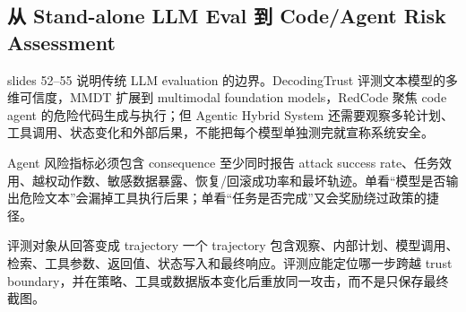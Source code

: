 \subsection{从 Stand-alone LLM Eval 到 Code/Agent Risk Assessment}

slides 52--55 说明传统 LLM evaluation 的边界。DecodingTrust 评测文本模型的多维可信度，MMDT 扩展到 multimodal foundation models，RedCode 聚焦 code agent 的危险代码生成与执行；但 Agentic Hybrid System 还需要观察多轮计划、工具调用、状态变化和外部后果，不能把每个模型单独测完就宣称系统安全。


\begin{importantbox}{Agent 风险指标必须包含 consequence}
至少同时报告 attack success rate、任务效用、越权动作数、敏感数据暴露、恢复/回滚成功率和最坏轨迹。单看“模型是否输出危险文本”会漏掉工具执行后果；单看“任务是否完成”又会奖励绕过政策的捷径。
\end{importantbox}

\begin{knowledgebox}{评测对象从回答变成 trajectory}
一个 trajectory 包含观察、内部计划、模型调用、检索、工具参数、返回值、状态写入和最终响应。评测应能定位哪一步跨越 trust boundary，并在策略、工具或数据版本变化后重放同一攻击，而不是只保存最终截图。
\end{knowledgebox}

